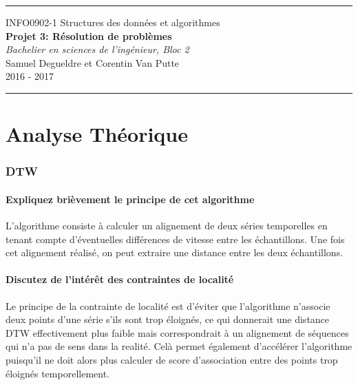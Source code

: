 \documentclass[a4paper,11pt]{article}
\begin{document}
\setcounter{page}{1}


\begin{center}


\rule{\linewidth}{0.3mm}
\LARGE
INFO0902-1 Structures des données et algorithmes\\
\vspace{0.3cm}
\large
\textbf{Projet 3: Résolution de problèmes}\\
\vspace{0.3cm}
\normalsize
\textit{Bachelier en sciences de l'ingénieur, Bloc 2}\\
\vspace{0.2cm}
Samuel Degueldre et Corentin Van Putte\\
\vspace{0.2cm}
2016 - 2017\\
\LARGE
\rule{\linewidth}{0.3mm}
 

\end{center}
\part{Analyse Théorique}


\section{DTW}
\subsection{Expliquez brièvement le principe de cet algorithme}

L’algorithme consiste à calculer un alignement de deux séries temporelles en tenant compte d’éventuelles différences de vitesse entre les échantillons. Une fois cet alignement réalisé, on peut extraire une distance entre les deux échantillons.\footnotemark[1]



\subsection{Discutez de l'intérêt des contraintes de localité}

Le principe de la contrainte de localité est d’éviter que l’algorithme n’associe deux points d’une série s’ils sont trop éloignés, ce qui donnerait une distance DTW effectivement plus faible mais correspondrait à un alignement de séquences qui n’a pas de sens dans la realité. Celà permet également d’accélérer l’algorithme puisqu’il ne doit alors plus calculer de score d’association entre des points trop éloignés temporellement.\footnotemark[1]
\end{document}
